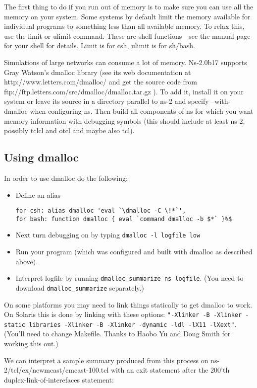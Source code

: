 The first thing to do if you run out of memory is to make sure you can use
all the memory on your system. Some systems by default limit the memory
available for individual programs to something less than all available
memory. To relax this, use the limit or ulimit command. These are shell
functions---see the manual page for your shell for details. Limit is for
csh, ulimit is for sh/bash. 

Simulations of large networks can consume a lot of memory. Ns-2.0b17
supports Gray Watson's dmalloc library (see its web documentation at
http://www.letters.com/dmalloc/ and get the source code from
ftp://ftp.letters.com/src/dmalloc/dmalloc.tar.gz ).
To add it, install it on your system or leave its source in
a directory parallel to ns-2 and specify --with-dmalloc when configuring
ns. Then build all components of ns for which you want memory information
with debugging symbols (this should include at least ns-2, possibly tclcl
and otcl and maybe also tcl). 


\subsection{Using dmalloc}
\label{sec:usedmalloc}

In order to use dmalloc do the following:
\begin{itemize}
\item Define an alias 
\begin{verbatim}
for csh: alias dmalloc 'eval `\dmalloc -C \!*`', 
for bash: function dmalloc { eval `command dmalloc -b $*` }%$
\end{verbatim}
\item Next turn debugging on by typing {\tt dmalloc -l logfile low }
\item Run your program (which was configured and built with dmalloc as
described above). 
\item Interpret logfile by running {\tt dmalloc\_summarize ns \<logfile}.
(You need to download {\tt dmalloc\_summarize} separately.) 
\end{itemize}

On some platforms you may need to link things statically to get dmalloc to
work. On Solaris this is done by linking with these options:
{\tt "-Xlinker -B -Xlinker -static {libraries} -Xlinker -B -Xlinker -dynamic -ldl -lX11 -lXext"}.
(You'll need to change Makefile. Thanks to
Haobo Yu and Doug Smith for working this out.) 

We can interpret a sample summary produced from this process on
ns-2/tcl/ex/newmcast/cmcast-100.tcl with an exit statement after the
200'th duplex-link-of-interefaces statement: 

